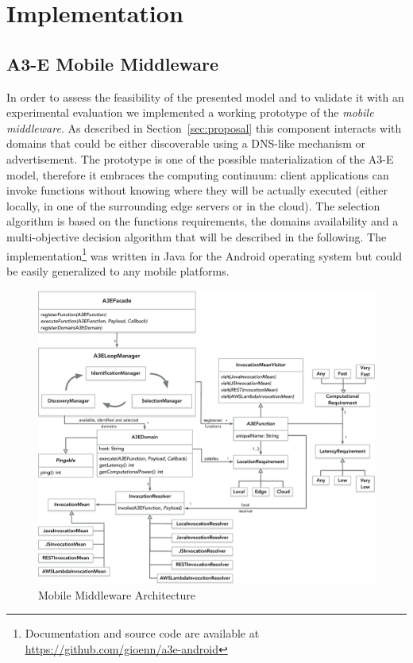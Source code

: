 \section{Implementation}
\subsection{A3-E Mobile Middleware}

In order to assess the feasibility of the presented model and to validate it with an experimental evaluation we implemented a working prototype of the \textit{mobile middleware}. As described in Section~\ref{sec:proposal} this component interacts with  domains that could be either discoverable using a DNS-like mechanism or advertisement. The prototype is one of the possible materialization of the A3-E model, therefore it embraces the computing continuum: client applications can invoke functions without knowing where they will be actually executed (either locally, in one of the surrounding edge servers or in the cloud). The selection algorithm is based on the functions requirements, the domains availability and a multi-objective decision algorithm that will be described in the following. The implementation\footnote{Documentation and source code are available at \url{https://github.com/gioenn/a3e-android}} was written in Java for the Android operating system but could be easily generalized to any mobile platforms. 
\begin{figure}[tbp]
	\includegraphics[width=1\textwidth]{figs/a3e-mobile-prototype}
	\caption{Mobile Middleware Architecture}
	\label{fig:mobile-prototype}
\end{figure}

